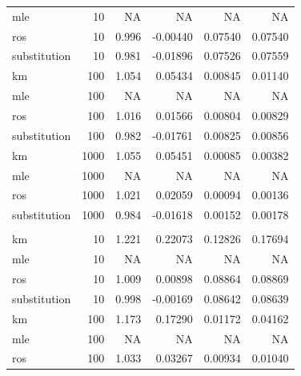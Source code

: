 \documentclass[12pt, twoside]{amherstthesis}
\begin{document}
\begin{table}
\begin{tabular}[t]{lrrrrr}
\hspace{1em}mle & 10 & NA & NA & NA & \vphantom{1} NA\\
\hspace{1em}ros & 10 & 0.996 & -0.00440 & 0.07540 & 0.07540\\
\hspace{1em}substitution & 10 & 0.981 & -0.01896 & 0.07526 & 0.07559\\
\hspace{1em}km & 100 & 1.054 & 0.05434 & 0.00845 & 0.01140\\
\hspace{1em}mle & 100 & NA & NA & NA & \vphantom{1} NA\\
\hspace{1em}ros & 100 & 1.016 & 0.01566 & 0.00804 & 0.00829\\
\hspace{1em}substitution & 100 & 0.982 & -0.01761 & 0.00825 & 0.00856\\
\hspace{1em}km & 1000 & 1.055 & 0.05451 & 0.00085 & 0.00382\\
\hspace{1em}mle & 1000 & NA & NA & NA & \vphantom{1} NA\\
\hspace{1em}ros & 1000 & 1.021 & 0.02059 & 0.00094 & 0.00136\\
\hspace{1em}substitution & 1000 & 0.984 & -0.01618 & 0.00152 & 0.00178\\
\addlinespace[1em]
\multicolumn{6}{l}{\textbf{Censoring Rate = 0.5}}\\
\hspace{1em}km & 10 & 1.221 & 0.22073 & 0.12826 & 0.17694\\
\hspace{1em}mle & 10 & NA & NA & NA & NA\\
\hspace{1em}ros & 10 & 1.009 & 0.00898 & 0.08864 & 0.08869\\
\hspace{1em}substitution & 10 & 0.998 & -0.00169 & 0.08642 & 0.08639\\
\hspace{1em}km & 100 & 1.173 & 0.17290 & 0.01172 & 0.04162\\
\hspace{1em}mle & 100 & NA & NA & NA & NA\\
\hspace{1em}ros & 100 & 1.033 & 0.03267 & 0.00934 & 0.01040\\

\end{tabular}
\end{table}
\end{document}
